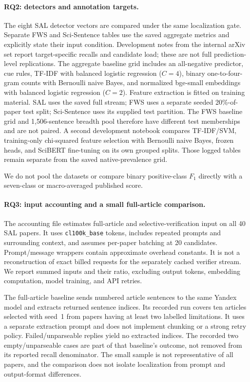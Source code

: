 \paragraph{RQ2: detectors and annotation targets.}
The eight SAL detector vectors are compared under the same localization gate. Separate FWS and
Sci-Sentence tables use the saved aggregate metrics and explicitly state their input condition.
Development notes from the internal arXiv set report target-specific recalls and candidate load;
these are not full prediction-level replications. The aggregate baseline grid includes an all-negative predictor, cue rules, TF-IDF with
balanced logistic regression ($C=4$), binary one-to-four-gram counts with Bernoulli naive Bayes,
and normalized bge-small embeddings with balanced logistic regression ($C=2$). Feature extraction
is fitted on training material. SAL uses the saved full stream; FWS uses a separate seeded
20\%-of-paper test split; Sci-Sentence uses its supplied test partition. The FWS baseline grid
and 1,506-sentence breadth pool therefore have different test memberships and are not paired.
A second development notebook compares TF-IDF/SVM, training-only chi-squared feature selection
with Bernoulli naive Bayes, frozen heads, and SciBERT fine-tuning on its own grouped splits.
Those logged tables remain separate from the saved native-prevalence grid.

We do not pool the datasets or compare binary
positive-class $F_1$ directly with a seven-class or macro-averaged published score.

\paragraph{RQ3: input accounting and a small full-article comparison.}
The accounting file estimates full-article and selective-verification input on all 40 SAL papers.
It uses \texttt{cl100k\_base} tokens, includes repeated prompts and surrounding context, and assumes
per-paper batching at 20 candidates. Prompt/message wrappers contain approximate overhead constants.
It is not a reconstruction of exact billed requests for the separately cached verifier stream.
We report summed inputs and their ratio, excluding output tokens, embedding computation, model
training, and API retries.

The full-article baseline sends numbered article sentences to the same Yandex model and extracts
returned sentence indices. Its recorded run covers ten articles selected with seed~1 from papers
having at least two labelled limitations. It uses a separate extraction prompt and does not implement
chunking or a strong retry policy. Failed/unparseable replies yield no extracted indices. The
recorded two empty/unparseable cases are part of that baseline's outcome, not removed from its
reported recall denominator. The small sample is not representative of all papers, and the
comparison does not isolate localization from prompt and output-format differences.

